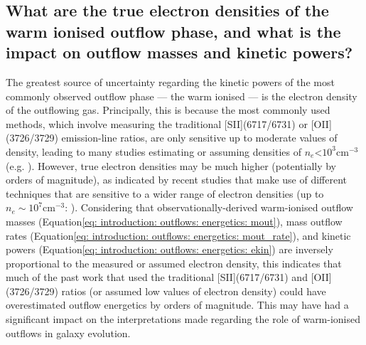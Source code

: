 \newpage

\subsection{What are the true electron densities of the warm ionised outflow phase, and what is the impact on outflow masses and kinetic powers?}
\label{section: conclusions_and_future_work: conclusions: electron_densities}

The greatest source of uncertainty regarding the kinetic powers of the most commonly observed outflow phase --- the warm ionised --- is the electron density of the outflowing gas. Principally, this is because the most commonly used methods, which involve measuring the traditional [SII](6717/6731) or [OII](3726/3729) emission-line ratios, are only sensitive up to moderate values of density, leading to many studies estimating or assuming densities of $n_e$\;\textless\;$10^{3}$\;cm$^{-3}$ (e.g. \citealt{Liu2013, Harrison2014, Fiore2017, Mingozzi2019}). However, true electron densities may be much higher (potentially by orders of magnitude), as indicated by recent studies that make use of different techniques that are sensitive to a wider range of electron densities (up to $n_e\sim10^7$\;cm$^{-3}$: \citealt{Holt2011, Baron2019b, Revalski2021}). Considering that observationally-derived warm-ionised outflow masses (Equation\;\ref{eq: introduction: outflows: energetics: mout}), mass outflow rates (Equation\;\ref{eq: introduction: outflows: energetics: mout_rate}), and kinetic powers (Equation\;\ref{eq: introduction: outflows: energetics: ekin}) are inversely proportional to the measured or assumed electron density, this indicates that much of the past work that used the traditional [SII](6717/6731) and [OII](3726/3729) ratios (or assumed low values of electron density) could have overestimated outflow energetics by orders of magnitude. This may have had a significant impact on the interpretations made regarding the role of warm-ionised outflows in galaxy evolution.


